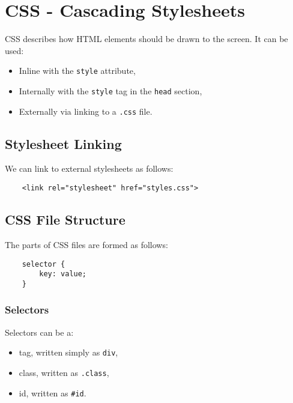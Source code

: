 \section{CSS - Cascading Stylesheets}

CSS describes how HTML elements should be drawn to the
screen. It can be used: \begin{itemize}
    \item Inline with the \texttt{style} attribute,
    \item Internally with the \texttt{style} tag in
    the \texttt{head} section,
    \item Externally via linking to a \texttt{.css} file. 
\end{itemize}

\subsection{Stylesheet Linking}

We can link to external stylesheets as follows: \begin{lstlisting}
    <link rel="stylesheet" href="styles.css"> 
\end{lstlisting}

\subsection{CSS File Structure}

The parts of CSS files are formed as follows: \begin{lstlisting}
    selector {
        key: value;
    }
\end{lstlisting}

\subsubsection{Selectors}

Selectors can be a: \begin{itemize}
    \item tag, written simply as \texttt{div},
    \item class, written as \texttt{.class},
    \item id, written as \texttt{\#id}.
\end{itemize}